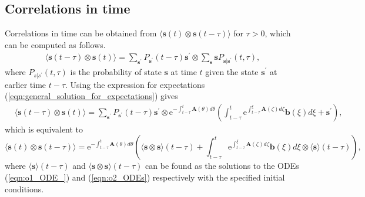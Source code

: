 \documentclass[a4paper, 11pt]{article}
\begin{document}
\subsection{Correlations in time}
Correlations in time can be obtained from $\langle\mathbf s(t)\otimes\mathbf s(t-\tau)\rangle$ for $\tau>0$, which can be computed as follows.
\begin{align*}
  \langle\mathbf s(t-\tau)\otimes\mathbf s(t)\rangle = \sum_{\mathbf s^\prime} P_{\mathbf s^\prime}(t-\tau)\mathbf s^\prime\otimes\sum_{\mathbf s}\mathbf sP_{\mathbf s|\mathbf s^\prime}(t, \tau),
\end{align*}
where $P_{s|s^\prime}(t, \tau)$ is the probability of state $\mathbf s$ at time $t$ given the state $\mathbf s^\prime$ at earlier time $t-\tau$. Using the expression for expectations (\ref{eqn:general_solution_for_expectations}) gives
\begin{align*}
  &\langle\mathbf s(t-\tau)\otimes\mathbf s(t)\rangle = \sum_\mathbf {s^\prime} P_{\mathbf s^\prime}(t-\tau)\mathbf s^\prime\otimes\mathrm e^{-\int_{t-\tau}^t\mathbf A(\theta)d\theta}\left(\int_{t-\tau}^t\mathrm e^{\int_{t-\tau}^\xi\mathbf A(\zeta)d\zeta}\mathbf b(\xi)d\xi + \mathbf s^\prime\right),
\end{align*}
which is equivalent to
\begin{equation*}
  \langle\mathbf s(t)\otimes\mathbf s(t-\tau)\rangle = \mathrm e^{-\int_{t-\tau}^t\mathbf A(\theta)d\theta}\left(\langle\mathbf s\otimes\mathbf s\rangle(t-\tau) + \int_{t-\tau}^t\mathrm e^{\int_{t-\tau}^\xi\mathbf A(\zeta)d\zeta}\mathbf b(\xi)d\xi\otimes \langle \mathbf s\rangle(t-\tau)\right),
\end{equation*}
where $\langle\mathbf s\rangle(t-\tau)$ and $\langle\mathbf s\otimes\mathbf s\rangle(t-\tau)$ can be found as the solutions to the ODEs (\ref{eqn:o1_ODE_}) and (\ref{eqn:o2_ODEs}) respectively with the specified initial conditions.

\end{document}

